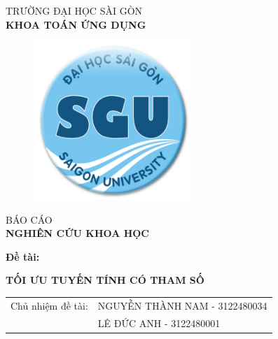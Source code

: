 \documentclass{article}
\begin{document}
 
\begin{titlepage}
    \begin{center}
        \vspace{-15pt} TRƯỜNG ĐẠI HỌC SÀI GÒN\\
        \textbf{\fontsize{16pt}{0pt}\selectfont KHOA TOÁN ỨNG DỤNG}
        \vspace{0.5cm}
        \begin{figure}[H]
            \centering
            \includegraphics[width=6cm,height=6cm]{imge/logodhsg.png}
        \end{figure}
        \vspace{1.5cm}
        \fontsize{28pt}{0pt}\selectfont BÁO CÁO\\
        \vspace{12pt}
        \textbf{\fontsize{32pt}{0pt}\selectfont NGHIÊN CỨU KHOA HỌC}
        \vspace{1.5cm}
        \end{center}
        \begin{center}
        \hspace{15pt}\textbf{\fontsize{30pt}{0pt}\selectfont Đề tài:}
        \begin{center}
        \textbf{\fontsize{20pt}{0pt}\selectfont TỐI ƯU TUYẾN TÍNH CÓ THAM SỐ} 
        \end{center}
        \vspace{1cm}
        \begin{table}[H]
            \centering
            \begin{tabular}{l l}
        \fontsize{14pt}{0pt}\selectfont Chủ nhiệm đề tài:     & \fontsize{14pt}{0pt}\selectfont NGUYỄN THÀNH NAM - 3122480034 \vspace{6pt}\\     
          & \fontsize{14pt}{0pt}\selectfont LÊ ĐỨC ANH - 3122480001 \vspace{6pt}\\
       

\end{tabular}
\end{table}
\end{center}
\end{titlepage}
\end{document}
